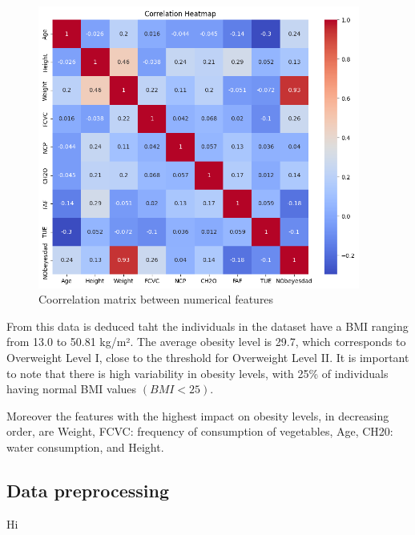 \documentclass[11pt, a4paper]{article}
\begin{document}
\begin{figure}[H]
    \centering
    \includegraphics[width=300pt]{images/correlation_matrix_between_features.png}
    \caption{Coorrelation matrix between numerical features}
    \label{fig:image_correlation_matrix_between_features}
\end{figure}

From this data is deduced taht the individuals in the dataset have a BMI ranging from 13.0 to 50.81 kg/m². The average obesity level is 29.7, 
which corresponds to Overweight Level I, close to the threshold for Overweight Level II. It is important to note that there is high variability 
in obesity levels, with 25\% of individuals having normal BMI values \((BMI < 25)\).

Moreover the features with the highest impact on obesity levels, in decreasing order, are Weight, FCVC: frequency of consumption of vegetables, 
Age, CH20: water consumption, and Height.

\subsection{Data preprocessing}

Hi



    
\end{document}
